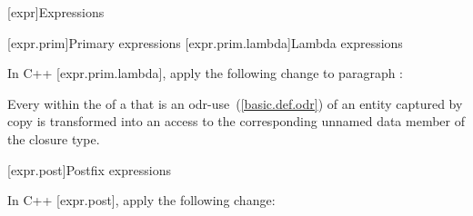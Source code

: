 [expr]{Expressions}

\setcounter{section}{0}
[expr.prim]{Primary expressions}
\setcounter{subsection}{1}
[expr.prim.lambda]{Lambda expressions}

\pnum
In C++ [expr.prim.lambda], apply the following change to paragraph :

\begin{std.txt}
Every  within the  of a  that is an odr-use~(\ref{basic.def.odr}) of an entity captured by copy is transformed into an access to the corresponding unnamed data member of the closure type.
\end{std.txt}

[expr.post]{Postfix expressions}

\pnum
In C++ [expr.post], apply the following change:

